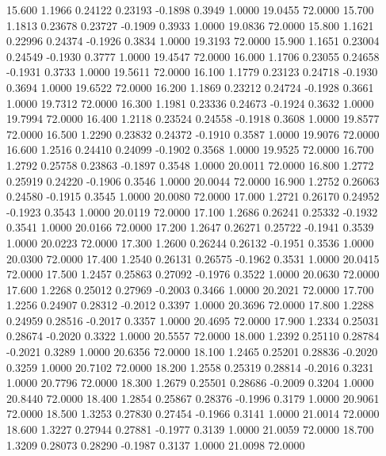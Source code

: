   15.600   1.1966   0.24122   0.23193  -0.1898   0.3949   1.0000  19.0455  72.0000
  15.700   1.1813   0.23678   0.23727  -0.1909   0.3933   1.0000  19.0836  72.0000
  15.800   1.1621   0.22996   0.24374  -0.1926   0.3834   1.0000  19.3193  72.0000
  15.900   1.1651   0.23004   0.24549  -0.1930   0.3777   1.0000  19.4547  72.0000
  16.000   1.1706   0.23055   0.24658  -0.1931   0.3733   1.0000  19.5611  72.0000
  16.100   1.1779   0.23123   0.24718  -0.1930   0.3694   1.0000  19.6522  72.0000
  16.200   1.1869   0.23212   0.24724  -0.1928   0.3661   1.0000  19.7312  72.0000
  16.300   1.1981   0.23336   0.24673  -0.1924   0.3632   1.0000  19.7994  72.0000
  16.400   1.2118   0.23524   0.24558  -0.1918   0.3608   1.0000  19.8577  72.0000
  16.500   1.2290   0.23832   0.24372  -0.1910   0.3587   1.0000  19.9076  72.0000
  16.600   1.2516   0.24410   0.24099  -0.1902   0.3568   1.0000  19.9525  72.0000
  16.700   1.2792   0.25758   0.23863  -0.1897   0.3548   1.0000  20.0011  72.0000
  16.800   1.2772   0.25919   0.24220  -0.1906   0.3546   1.0000  20.0044  72.0000
  16.900   1.2752   0.26063   0.24580  -0.1915   0.3545   1.0000  20.0080  72.0000
  17.000   1.2721   0.26170   0.24952  -0.1923   0.3543   1.0000  20.0119  72.0000
  17.100   1.2686   0.26241   0.25332  -0.1932   0.3541   1.0000  20.0166  72.0000
  17.200   1.2647   0.26271   0.25722  -0.1941   0.3539   1.0000  20.0223  72.0000
  17.300   1.2600   0.26244   0.26132  -0.1951   0.3536   1.0000  20.0300  72.0000
  17.400   1.2540   0.26131   0.26575  -0.1962   0.3531   1.0000  20.0415  72.0000
  17.500   1.2457   0.25863   0.27092  -0.1976   0.3522   1.0000  20.0630  72.0000
  17.600   1.2268   0.25012   0.27969  -0.2003   0.3466   1.0000  20.2021  72.0000
  17.700   1.2256   0.24907   0.28312  -0.2012   0.3397   1.0000  20.3696  72.0000
  17.800   1.2288   0.24959   0.28516  -0.2017   0.3357   1.0000  20.4695  72.0000
  17.900   1.2334   0.25031   0.28674  -0.2020   0.3322   1.0000  20.5557  72.0000
  18.000   1.2392   0.25110   0.28784  -0.2021   0.3289   1.0000  20.6356  72.0000
  18.100   1.2465   0.25201   0.28836  -0.2020   0.3259   1.0000  20.7102  72.0000
  18.200   1.2558   0.25319   0.28814  -0.2016   0.3231   1.0000  20.7796  72.0000
  18.300   1.2679   0.25501   0.28686  -0.2009   0.3204   1.0000  20.8440  72.0000
  18.400   1.2854   0.25867   0.28376  -0.1996   0.3179   1.0000  20.9061  72.0000
  18.500   1.3253   0.27830   0.27454  -0.1966   0.3141   1.0000  21.0014  72.0000
  18.600   1.3227   0.27944   0.27881  -0.1977   0.3139   1.0000  21.0059  72.0000
  18.700   1.3209   0.28073   0.28290  -0.1987   0.3137   1.0000  21.0098  72.0000
